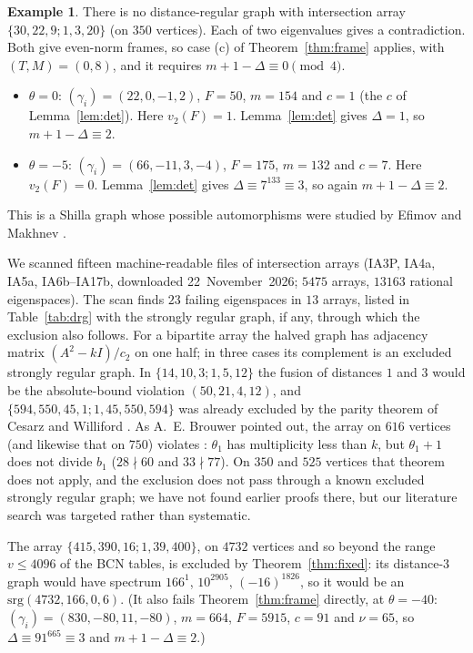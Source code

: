 \documentclass[11pt]{article}
\theoremstyle{definition}
\newtheorem{example}[theorem]{Example}
\theoremstyle{remark}
\begin{document}
\begin{example}\label{ex:shilla}
There is no distance-regular graph with intersection array $\{30,22,9;1,3,20\}$
(on $350$ vertices). Each of two eigenvalues gives a contradiction. Both give
even-norm frames, so case (c) of Theorem~\ref{thm:frame} applies, with
$(T,M)=(0,8)$, and it requires $m+1-\Delta\equiv0\pmod 4$.
\begin{itemize}
\item $\theta=0$: $(\gamma_i)=(22,0,-1,2)$, $F=50$, $m=154$ and $c=1$ (the $c$ of Lemma~\ref{lem:det}). Here
$v_2(F)=1$. Lemma~\ref{lem:det} gives $\Delta=1$, so $m+1-\Delta\equiv2$.
\item $\theta=-5$: $(\gamma_i)=(66,-11,3,-4)$, $F=175$, $m=132$ and $c=7$. Here
$v_2(F)=0$. Lemma~\ref{lem:det} gives $\Delta\equiv7^{133}\equiv3$, so again
$m+1-\Delta\equiv2$.
\end{itemize}
This is a Shilla graph whose possible automorphisms were studied by Efimov and
Makhnev \cite{EM}.
\end{example}

We scanned fifteen machine-readable files of intersection arrays
\cite{DRGtab} (IA3P, IA4a, IA5a, IA6b--IA17b, downloaded 22~November~2026; $5475$ arrays, $13163$ rational eigenspaces). The
scan finds $23$ failing eigenspaces in $13$ arrays, listed in
Table~\ref{tab:drg} with the strongly regular graph, if any, through which the
exclusion also follows. For a bipartite array the halved graph has adjacency
matrix $(A^2-kI)/c_2$ on one half; in three cases its complement is an excluded
strongly regular graph. In
$\{14,10,3;1,5,12\}$ the fusion of distances $1$ and $3$ would be the
absolute-bound violation $(50,21,4,12)$, and $\{594,550,45,1;1,45,550,594\}$ was already excluded by the
parity theorem of Cesarz and Williford \cite{CW}. As A.~E. Brouwer pointed out,
the array on $616$ vertices (and likewise that on $750$) violates
\cite[Theorem~4.4.4]{BCN}: $\theta_1$ has multiplicity less than $k$, but
$\theta_1+1$ does not divide $b_1$ ($28\nmid60$ and $33\nmid77$). On $350$ and
$525$ vertices that theorem does not apply, and the exclusion does not pass
through a known excluded strongly regular graph; we have not found earlier
proofs there, but our literature search was targeted rather than systematic.

The array $\{415,390,16;1,39,400\}$, on $4732$ vertices and so beyond the
range $v\le4096$ of the BCN tables, is excluded by Theorem~\ref{thm:fixed}: its distance-$3$ graph would have
spectrum $166^1$, $10^{2905}$, $(-16)^{1826}$, so it would be an
$\mathrm{srg}(4732,166,0,6)$. (It also fails Theorem~\ref{thm:frame} directly,
at $\theta=-40$: $(\gamma_i)=(830,-80,11,-80)$, $m=664$, $F=5915$, $c=91$ and
$\nu=65$, so $\Delta\equiv91^{665}\equiv3$ and $m+1-\Delta\equiv2$.)
\end{document}
